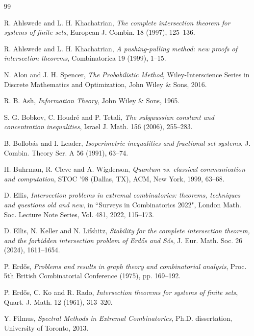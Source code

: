 \begin{thebibliography}{99}

 R. Ahlswede and L. H. Khachatrian,
\textit{The complete intersection theorem for systems of finite sets},
European J. Combin. 18 (1997), 125--136.

 R. Ahlswede and L. H. Khachatrian,
\textit{A pushing-pulling method: new proofs of intersection theorems},
Combinatorica 19 (1999), 1--15.

 N. Alon and J. H. Spencer,
\textit{The Probabilistic Method},
Wiley-Interscience Series in Discrete Mathematics and Optimization, John Wiley \& Sons, 2016.

 R. B. Ash,
\textit{Information Theory},
John Wiley \& Sons, 1965.

 S. G. Bobkov, C. Houdr{\'{e}} and P. Tetali,
\emph{The subgaussian constant and concentration inequalities},
Israel J. Math. 156 (2006), 255--283.

 B. Bollob{\'{a}}s and I. Leader,
\emph{Isoperimetric inequalities and fractional set systems},
J. Combin. Theory Ser. A 56 (1991), 63--74.

 H. Buhrman, R. Cleve and A. Wigderson,
\emph{Quantum vs. classical communication and computation},
STOC ’98 (Dallas, TX), ACM, New York, 1999, 63--68.

 D. Ellis,
\emph{Intersection problems in extremal combinatorics: theorems, techniques and questions old and new},
in ``Surveys in Combinatorics 2022", London Math. Soc. Lecture Note Series, Vol. 481,
2022, 115--173.

 D. Ellis, N. Keller and N. Lifshitz,
\emph{Stability for the complete intersection theorem, and the forbidden intersection problem
of Erd\H{o}s and S\'{o}s}, J. Eur. Math. Soc. 26 (2024), 1611--1654.

 P. Erd\H{o}s,
\emph{Problems and results in graph theory and combinatorial analysis},
Proc. 5th British Combinatorial Conference (1975), pp. 169--192.

 P. Erd\H{o}s, C. Ko and R. Rado,
\emph{Intersection theorems for systems of finite sets},
Quart. J. Math. 12 (1961), 313--320.

 Y. Filmus,
\textit{Spectral Methods in Extremal Combinatorics},
Ph.D. dissertation, University of Toronto, 2013.


\end{thebibliography}
